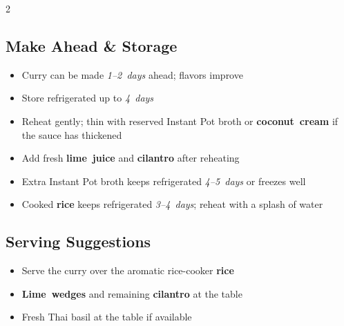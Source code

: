 \documentclass[11pt,letterpaper]{article}
\begin{document}
{\begin{multicols}{2}
\subsection*{Make Ahead \& Storage}
\begin{itemize}
    \item Curry can be made \textit{1--2~days} ahead; flavors improve
    \item Store refrigerated up to \textit{4~days}
    \item Reheat gently; thin with reserved Instant Pot broth or \textbf{coconut~cream} if the sauce has thickened
    \item Add fresh \textbf{lime~juice} and \textbf{cilantro} after reheating
    \item Extra Instant Pot broth keeps refrigerated \textit{4--5~days} or freezes well
    \item Cooked \textbf{rice} keeps refrigerated \textit{3--4~days}; reheat with a splash of water
\end{itemize}

\subsection*{Serving Suggestions}
\begin{itemize}
    \item Serve the curry over the aromatic rice-cooker \textbf{rice}
    \item \textbf{Lime~wedges} and remaining \textbf{cilantro} at the table
    \item Fresh Thai basil at the table if available
\end{itemize}

\end{multicols}
}
\end{document}
